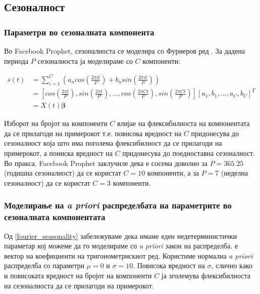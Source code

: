 \documentclass[12pt]{article}
\numberwithin{equation}{section}
\begin{document}
\subsection{Сезоналност}

\subsubsection{Параметри во сезоналната компонента}

Во Facebook Prophet, сезоналноста се моделира со Фуриеров ред \cite{harvey199310}. За дадена периода \(P\) сезоналноста ја моделираме со \(C\) компоненти:

\begin{equation}\label{fourier_seasonality}
\begin{aligned}
    s(t) &= \sum_{i=1}^{C} (a_ncos(\frac{2\pi it}{P}) + b_nsin(\frac{2\pi it}{P})) \\
    &= [cos(\frac{2\pi t}{P}), sin(\frac{2\pi t}{P}), ..., cos(\frac{2\pi Ct}{P}), sin(\frac{2\pi Ct}{P})][a_1,b_1,...,a_C,b_C]^T \\
    &= X(t)\boldsymbol{\beta}
\end{aligned}
\end{equation}

Изборот на бројот на компоненти \(C\) влијае на флексибилноста на компонентата да се прилагоди на примерокот т.е. повисока вредност на \(C\) придонесува до сезоналност која што има поголема флексибилност да се прилагоди на примерокот, а пониска вредност на \(C\) придонесува до поедноставна сезоналност. Во пракса, Facebook Prophet заклучиле дека е сосема доволно за \(P=365.25\) (годишна сезоналност) да се користат \(C=10\) компоненти, а за \(P=7\) (неделна сезоналност) да се користат \(C=3\) компоненти.

\subsubsection{Моделирање на \textit{a priori} распределбата на параметрите во сезоналната компонентата}

Од \ref{fourier_seasonality} забележуваме дека имаме еден недетерминистички параметар кој можеме да го моделираме со \textit{a priori} закон на распределба. \boldsymbol{\beta} е вектор на коефициенти на тригонометрискиот ред. Користиме нормална \textit{a priori} распределба со параметри \(\mu=0\) и \(\sigma=10\). Повисока вредност на \(\sigma\), слично како и повисоката вредност на бројот на компоненти \(C\) ја зголемува флексибилноста на сезоналноста да се прилагоди на примерокот.
\end{document}
